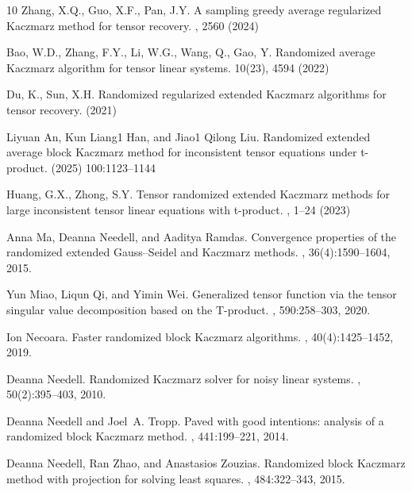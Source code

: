 \documentclass[11pt]{article}
\begin{document}
{\begin{thebibliography}{10}
Zhang, X.Q., Guo, X.F., Pan, J.Y.
\newblock A sampling greedy average regularized Kaczmarz method for tensor
recovery. 
, 2560 (2024)

Bao, W.D., Zhang, F.Y., Li, W.G., Wang, Q., Gao, Y.
\newblock Randomized average Kaczmarz algorithm for
tensor linear systems. 
 10(23), 4594 (2022)

Du, K., Sun, X.H.
\newblock Randomized regularized extended Kaczmarz algorithms for tensor recovery. 
(2021)

Liyuan An, Kun Liang1 Han, and Jiao1 Qilong Liu.
\newblock Randomized extended average block Kaczmarz method
for inconsistent tensor equations under t-product.
 (2025) 100:1123–1144

 Huang, G.X., Zhong, S.Y.
\newblock Tensor randomized extended Kaczmarz methods for large inconsistent
tensor linear equations with t-product. 
, 1–24 (2023)


Anna Ma, Deanna Needell, and Aaditya Ramdas.
\newblock Convergence properties of the randomized extended {G}auss--{S}eidel
  and {K}aczmarz methods.
, 36(4):1590--1604, 2015.

Yun Miao, Liqun Qi, and Yimin Wei.
\newblock Generalized tensor function via the tensor singular value
  decomposition based on the {T}-product.
, 590:258--303, 2020.




Ion Necoara.
\newblock Faster randomized block {K}aczmarz algorithms.
, 40(4):1425--1452, 2019.

Deanna Needell.
\newblock Randomized {K}aczmarz solver for noisy linear systems.
, 50(2):395--403, 2010.

Deanna Needell and Joel~A. Tropp.
\newblock Paved with good intentions: analysis of a randomized block {K}aczmarz
  method.
, 441:199--221, 2014.

Deanna Needell, Ran Zhao, and Anastasios Zouzias.
\newblock Randomized block {K}aczmarz method with projection for solving least
  squares.
, 484:322--343, 2015.



\end{thebibliography}}
\end{document}
